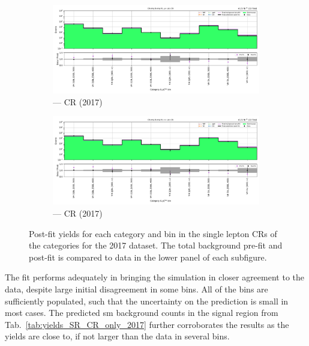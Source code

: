 \begin{figure}[htbp]
    \centering
    \begin{subfigure}[b]{\textwidth}
        \includegraphics[width=\textwidth]{chapters/higgstoinv/figures/mountain_ranges/2017/VH/Wmunu_tree_fit_b-abs_values_VH_cats.pdf}
        \caption{\VH --- \singleMuCr \gls{CR} (2017)}
    \end{subfigure}
    \hfill
    \begin{subfigure}[b]{\textwidth}
        \includegraphics[width=\textwidth]{chapters/higgstoinv/figures/mountain_ranges/2017/VH/Wenu_tree_fit_b-abs_values_VH_cats.pdf}
        \caption{\VH --- \singleEleCr \gls{CR} (2017)}
    \end{subfigure}
    \caption[Post-fit yields for each category and \ptmiss bin in the single lepton control regions of the \VH categories for the 2017 dataset]{Post-fit yields for each category and \ptmiss bin in the single lepton \glspl{CR} of the \VH categories for the 2017 dataset. The total background pre-fit and post-fit is compared to data in the lower panel of each subfigure.}
    \label{fig:htoinv_mountain_range_2017_single_lep_VH}
\end{figure}

\clearpage

The fit performs adequately in bringing the simulation in closer agreement to the data, despite large initial disagreement in some bins. All of the bins are sufficiently populated, such that the uncertainty on the prediction is small in most cases. The predicted \acrshort{sm} background counts in the signal region from Tab.~\ref{tab:yields_SR_CR_only_2017} further corroborates the results as the yields are close to, if not larger than the data in several bins.


